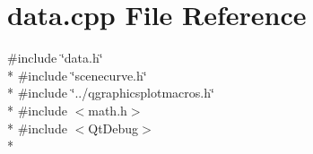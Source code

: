 \section{data.\+cpp File Reference}
\label{curve_2data_8cpp}
{\ttfamily \#include \char`\"{}data.\+h\char`\"{}}\\*
{\ttfamily \#include \char`\"{}scenecurve.\+h\char`\"{}}\\*
{\ttfamily \#include \char`\"{}../qgraphicsplotmacros.\+h\char`\"{}}\\*
{\ttfamily \#include $<$math.\+h$>$}\\*
{\ttfamily \#include $<$Qt\+Debug$>$}\\*

